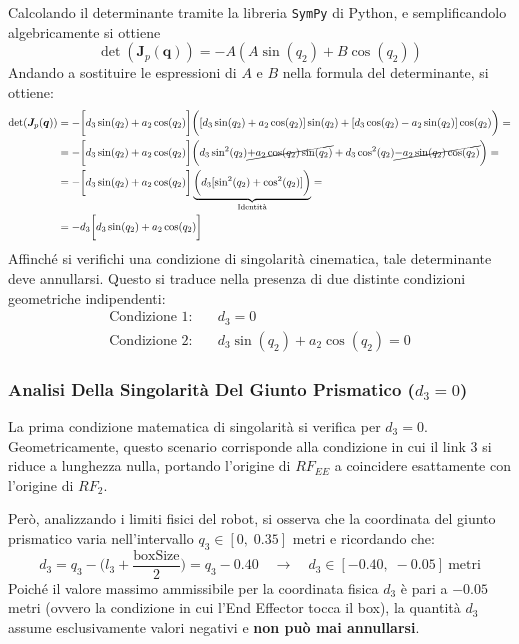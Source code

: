 ﻿\documentclass[11pt, a4paper]{article}
\begin{document}
Calcolando il determinante tramite la libreria \texttt{SymPy} di Python, e semplificandolo algebricamente si ottiene
\[
    \det(\bm{J}_p(\bm{q})) = - A (A \sin(q_{2}) + B \cos(q_{2}))
\]
\newpage
Andando a sostituire le espressioni di $A$ e $B$ nella formula del determinante, si ottiene:
\begin{align*}
    \det(\bm{J}_p(\bm{q})) &= - \biggl[d_{3}\sin(q_{2}) + a_{2}\cos(q_{2})\biggr] \biggl([d_{3}\sin(q_{2}) + a_{2}\cos(q_{2})] \sin(q_{2}) + [d_{3}\cos(q_{2}) - a_{2}\sin(q_{2})] \cos(q_{2})\biggr) =\\
    &= - \biggl[d_{3}\sin(q_{2}) + a_{2}\cos(q_{2})\biggr] \biggl(d_{3}\sin^{2}(q_{2}) \cancel{+ a_{2}\cos(q_{2})\sin(q_{2})} + d_{3}\cos^{2}(q_{2}) \cancel{- a_{2}\sin(q_{2})\cos(q_{2})}\biggr) =\\
    &= - \biggl[d_{3}\sin(q_{2}) + a_{2}\cos(q_{2})\biggr] \underbrace{\biggl(d_{3}[\sin^{2}(q_{2}) + \cos^{2}(q_{2})]\biggr)}_{\text{Identità}} =\\
    &= - d_{3}\biggl[d_{3}\sin(q_{2}) + a_{2}\cos(q_{2})\biggr]
\end{align*}
Affinché si verifichi una condizione di singolarità cinematica, tale determinante deve annullarsi. Questo si traduce nella presenza di due distinte condizioni geometriche indipendenti:
\begin{align*}
    \text{Condizione 1:} \quad & d_3 = 0 \\
    \text{Condizione 2:} \quad & d_3 \sin(q_2) + a_2 \cos(q_2) = 0
\end{align*}

\subsubsection*{Analisi Della Singolarità Del Giunto Prismatico ($d_3 = 0$)}

La prima condizione matematica di singolarità si verifica per $d_3 = 0$. Geometricamente, questo scenario corrisponde alla condizione in cui il link 3 si riduce a lunghezza nulla, portando l'origine di $RF_{EE}$ a coincidere esattamente con l'origine di $RF_{2}$.

Però, analizzando i limiti fisici del robot, si osserva che la coordinata del giunto prismatico varia nell'intervallo $q_3 \in [0, \; 0.35]$ metri e ricordando che:
\[
    d_3 = q_3 - \biggl(l_3 + \frac{\text{boxSize}}{2}\biggr) = q_3 - 0.40 \quad\longrightarrow\quad d_3 \in [-0.40, \; -0.05] \ \text{metri}
\]
Poiché il valore massimo ammissibile per la coordinata fisica $d_3$ è pari a $-0.05$ metri (ovvero la condizione in cui l'End Effector tocca il box), la quantità $d_3$ assume esclusivamente valori negativi e \textbf{non può mai annullarsi}.
\end{document}
